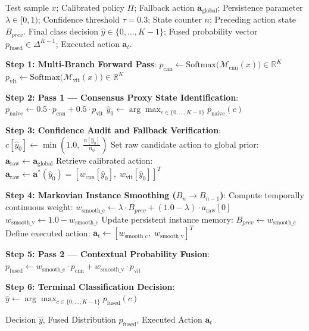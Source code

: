 \documentclass[10pt,journal,compsoc]{IEEEtran}
\begin{document}
\begin{algorithm}[H]
\caption{Online Inference with Proxy State Routing and Markovian Instance Smoothing}
\label{alg:inference}
\begin{algorithmic}[1]
\REQUIRE Test sample $x$; Calibrated policy $\Pi$; Fallback action $\mathbf{a}_{\text{global}}$; Persistence parameter $\lambda \in [0, 1)$; Confidence threshold $\tau = 0.3$; State counter $n$; Preceding action state $B_{prev}$.
\ENSURE Final class decision $\hat{y} \in \{0, \dots, K-1\}$; Fused probability vector $p_{\text{fused}} \in \Delta^{K-1}$; Executed action $\mathbf{a}_t$.

\STATE \textbf{Step 1: Multi-Branch Forward Pass}:
\STATE $p_{\text{cnn}} \leftarrow \text{Softmax}\big(\mathcal{M}_{\text{cnn}}(x)\big) \in \mathbb{R}^K$
\STATE $p_{\text{vit}} \leftarrow \text{Softmax}\big(\mathcal{M}_{\text{vit}}(x)\big) \in \mathbb{R}^K$

\STATE \textbf{Step 2: Pass 1 — Consensus Proxy State Identification}:
\STATE $p_{\text{naive}} \leftarrow 0.5 \cdot p_{\text{cnn}} + 0.5 \cdot p_{\text{vit}}$
\STATE $\hat{y}_0 \leftarrow \arg\max_{c \in \{0, \dots, K-1\}} p_{\text{naive}}(c)$ 

\STATE \textbf{Step 3: Confidence Audit and Fallback Verification}:
\STATE $c[\hat{y}_0] \leftarrow \min\left(1.0, \; \frac{n[\hat{y}_0]}{n_0}\right)$
    \STATE Set raw candidate action to global prior: $\mathbf{a}_{\text{raw}} \leftarrow \mathbf{a}_{\text{global}}$
\ELSE
    \STATE Retrieve calibrated action: $\mathbf{a}_{\text{raw}} \leftarrow \mathbf{a}^*(\hat{y}_0) = [w_{\text{cnn}}[\hat{y}_0], \; w_{\text{vit}}[\hat{y}_0]]^T$
\ENDIF

\STATE \textbf{Step 4: Markovian Instance Smoothing ($B_n \to B_{n-1}$)}:
\STATE Compute temporally continuous weight:
\STATE \quad $w_{\text{smooth\_c}} \leftarrow \lambda \cdot B_{prev} + (1.0 - \lambda) \cdot a_{\text{raw}}[0]$
\STATE \quad $w_{\text{smooth\_v}} \leftarrow 1.0 - w_{\text{smooth\_c}}$
\STATE Update persistent instance memory: $B_{prev} \leftarrow w_{\text{smooth\_c}}$
\STATE Define executed action: $\mathbf{a}_t \leftarrow [w_{\text{smooth\_c}}, \; w_{\text{smooth\_v}}]^T$

\STATE \textbf{Step 5: Pass 2 — Contextual Probability Fusion}:
\STATE $p_{\text{fused}} \leftarrow w_{\text{smooth\_c}} \cdot p_{\text{cnn}} + w_{\text{smooth\_v}} \cdot p_{\text{vit}}$

\STATE \textbf{Step 6: Terminal Classification Decision}:
\STATE $\hat{y} \leftarrow \arg\max_{c \in \{0, \dots, K-1\}} p_{\text{fused}}(c)$

\RETURN Decision $\hat{y}$, Fused Distribution $p_{\text{fused}}$, Executed Action $\mathbf{a}_t$
\end{algorithmic}
\end{algorithm}
\end{document}
